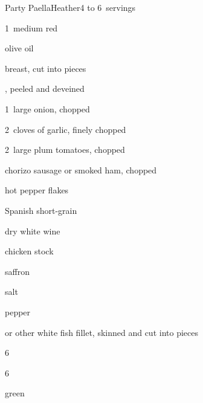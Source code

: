 \begin{recipe}{Party Paella}{Heather}{4 to 6~servings}

\begin{ingredients}
\item 1~medium red 
\item \C{\quarter} olive oil
\item \lbs{\half}  breast, cut into  pieces
\item \lbs{\half} , peeled and deveined
\item 1~large onion, chopped
\item 2~cloves of garlic, finely chopped
\item 2~large plum tomatoes, chopped
\item \lbs{\quarter} chorizo sausage or smoked ham, chopped
\item \tp{\half} hot pepper flakes
\item \C{1\half} Spanish short-grain 
\item \C{\half} dry white wine
\item {} chicken stock
\item \tp{\quarter} saffron
\item \tp{\half} salt
\item \tp{\quarter} pepper
\item \lbs{\half}  or other white fish fillet, skinned and cut into  pieces
\item 6~
\item 6~
\item {} green 
\end{ingredients}


\end{recipe}
